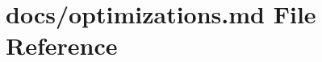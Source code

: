 \hypertarget{optimizations_8md}{}\section{docs/optimizations.md File Reference}
\label{optimizations_8md}
